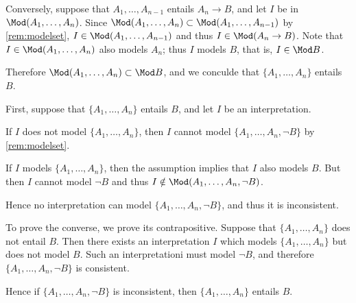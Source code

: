 \begin{myproof}
\begin{nlist}
        Conversely, suppose that
        \(A_1,\dots,A_{n-1}\) entails \(A_n\to B\),
        and let \(I\) be in \(\Mod(A_1,\dots,A_n)\).
        Since \(\Mod(A_1,\dots,A_n)\subset\Mod(A_1,\dots,A_{n-1})\)
        by \cref{rem:modelset},
        \(I\in\Mod(A_1,\dots,A_{n-1})\) and thus \(I\in\Mod(A_n\to B)\).
        Note that \(I\in\Mod(A_1,\dots,A_n)\) also models \(A_n\);
        thus \(I\) models \(B\), that is, \(I\in\Mod B\).

        Therefore \(\Mod(A_1,\dots,A_n)\subset\Mod B\),
        and we conculde that \(\{A_1,\dots,A_n\}\) entails \(B\).

        \item First, suppose that \(\{A_1,\dots,A_n\}\) entails \(B\),
        and let \(I\) be an interpretation.
        
        If \(I\) does not model \(\{A_1,\dots,A_n\}\),
        then \(I\) cannot model \(\{A_1,\dots,A_n,\neg B\}\)
        by \cref{rem:modelset}.

        If \(I\) models \(\{A_1,\dots,A_n\}\),
        then the assumption implies that \(I\) also models \(B\).
        But then \(I\) cannot model \(\neg B\)
        and thus \(I\notin\Mod(A_1,\dots,A_n,\neg B)\).

        Hence no interpretation can model \(\{A_1,\dots,A_n,\neg B\}\),
        and thus it is inconsistent.

        To prove the converse,
        we prove its contrapositive.
        Suppose that \(\{A_1,\dots,A_n\}\) does not entail \(B\).
        Then there exists an interpretation \(I\)
        which models \(\{A_1,\dots,A_n\}\) but does not model \(B\).
        Such an interpretationi must model \(\neg B\),
        and therefore \(\{A_1,\dots,A_n,\neg B\}\) is consistent.

        Hence if \(\{A_1,\dots,A_n,\neg B\}\) is inconsistent,
        then \(\{A_1,\dots,A_n\}\) entails \(B\).
        \rightqed
    \end{nlist}
\end{myproof}